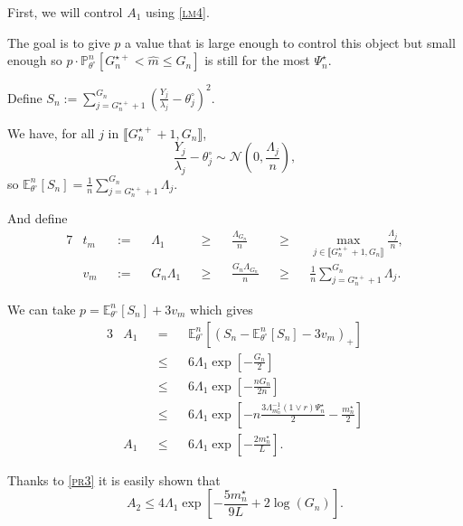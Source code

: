 \medskip

First, we will control $A_{1}$ using \textsc{\cref{lm4}}.

The goal is to give $p$ a value that is large enough to control this object but small enough so $p \cdot \mathds{P}_{\theta^{\circ}}^{n} \left[G_{n}^{\star+} < \widehat{m} \leq G_{n}\right]$ is still for the most $\Psi_{n}^{\star}$.

Define $S_{n} := \sum\limits_{j = G_{n}^{\star+} + 1}^{G_{n}}\left(\frac{Y_{j}}{\lambda_{j}} - \theta^{\circ}_{j}\right)^{2}.$

We have, for all $j$ in $\llbracket G_{n}^{\star+} + 1, G_{n} \rrbracket$,
\[ \frac{Y_{j}}{\lambda_{j}} - \theta^{\circ}_{j} \sim \mathcal{N}\left(0, \frac{\Lambda_{j}}{n} \right), \]
so $\mathds{E}_{\theta^{\circ}}^{n}\left[S_{n}\right] = \frac{1}{n} \sum\limits_{j = G_{n}^{\star+} + 1}^{G_{n}} \Lambda_{j}$.

And define
\begin{alignat*}{7}
& t_{m} && := && \Lambda_{1} && \geq && \frac{\Lambda_{G_{n}}}{n} && \geq && \max\limits_{j \in \llbracket G_{n}^{\star+} + 1, G_{n} \rrbracket} \frac{\Lambda_{j}}{n},\\
& v_{m} && := && G_{n} \Lambda_{1} && \geq && \frac{G_{n} \Lambda_{G_{n}}}{n} && \geq &&  \frac{1}{n} \sum\limits_{j = G_{n}^{\star+} + 1}^{G_{n}} \Lambda_{j}.
\end{alignat*}

We can take $p = \mathds{E}_{\theta^{\circ}}^{n}\left[S_{n}\right] + 3 v_{m}$ which gives
\begin{alignat*}{3}
& A_{1} && = && \mathds{E}_{\theta^{\circ}}^{n}\left[\left(S_{n} - \mathds{E}_{\theta^{\circ}}^{n}\left[S_{n}\right] - 3 v_{m}\right)_{+}\right]\\
& && \leq && 6 \Lambda_{1} \exp\left[- \frac{G_{n}}{2}\right]\\
& && \leq && 6 \Lambda_{1} \exp\left[- \frac{n G_{n}}{2 n}\right]\\
& && \leq && 6 \Lambda_{1} \exp\left[- n \frac{3 \Lambda_{m_{n}^{\star}}^{-1} \left(1 \vee r \right) \Psi_{n}^{\star}}{2} - \frac{m_{n}^{\star}}{2}\right]\\
& A_{1} && \leq && 6 \Lambda_{1} \exp\left[- \frac{2 m_{n}^{\star}}{L}\right].
\end{alignat*}

\medskip

Thanks to \textsc{\cref{pr3}} it is easily shown that
\[A_{2} \leq 4 \Lambda_{1} \exp\left[-\frac{5 m_{n}^{\star}}{9 L} + 2 \log \left(G_{n}\right)\right].\]

